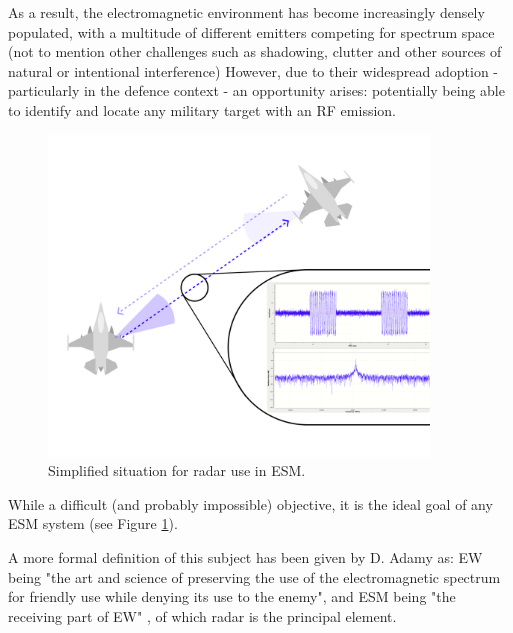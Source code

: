 As a result, the electromagnetic environment has become increasingly densely populated, with a multitude of different emitters competing for spectrum space (not to mention other challenges such as shadowing, clutter and other sources of natural or intentional interference)
However, due to their widespread adoption - particularly in the defence context - an opportunity arises: potentially being able to identify and locate any military target with an \ac{RF} emission.
\begin{figure}
    \centering
    \includegraphics[width=0.9\textwidth]{Figures/Senario_ Single Radar; single signal.png}
    \caption{Simplified situation for radar use in ESM.}
    \label{Fig:radar_signals_in_ew}
\end{figure}

While a difficult (and probably impossible) objective, it is the ideal goal of any \ac{ESM} system (see Figure \ref{Fig:radar_signals_in_ew}).

A more formal definition of this subject has been given by D. Adamy \cite{adamy_13_2001} as: \ac{EW} being "the art and science of preserving the use of the electromagnetic spectrum for friendly use while denying its use to the enemy", and \ac{ESM} being "the receiving part of EW" \cite{adamy_13_2001}, of which radar is the principal element.


